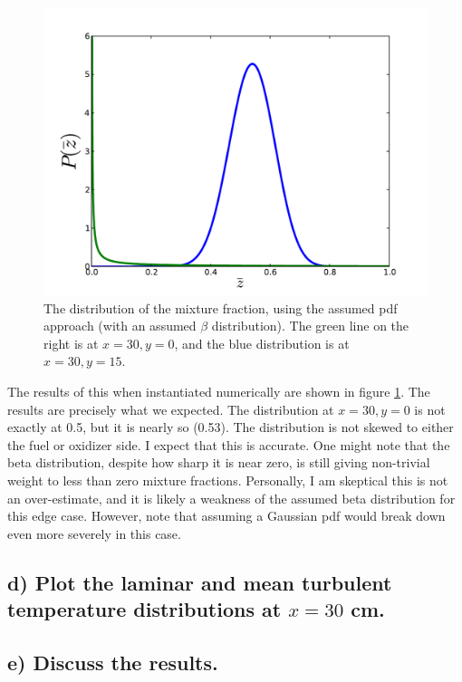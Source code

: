 \documentclass{article}
\begin{document}
  \begin{figure}[!htb]
   \begin{center}
    \includegraphics[width = 12 cm]{figs/pdf.pdf}
    \caption{The distribution of the mixture fraction, using the assumed
    pdf approach (with an assumed $\beta$ distribution). The green line
    on the right is at $x=30,y=0$, and the blue distribution is at $x=30,y=15$.}
    \label{pdf}
   \end{center}
  \end{figure}

The results of this when instantiated numerically are shown in figure
\ref{pdf}. The results are precisely what we expected. The distribution
at $x=30,y=0$ is not exactly at 0.5, but it is nearly so (0.53). The
distribution is not skewed to either the fuel or oxidizer side. 
I expect that this is accurate. 
One might note
that the beta distribution, despite how sharp it is near zero, is still
giving non-trivial weight to less than zero mixture
fractions. Personally, I am skeptical this is not an over-estimate, and
it is likely a weakness of the assumed beta distribution for this edge
case. However, note that assuming a Gaussian pdf would break down even
more severely in this case. 

%
%
%
%
\subsection*{d) Plot the laminar and mean turbulent temperature
distributions at $x=30$ cm.}

\subsection*{e) Discuss the results.}
\end{document}
